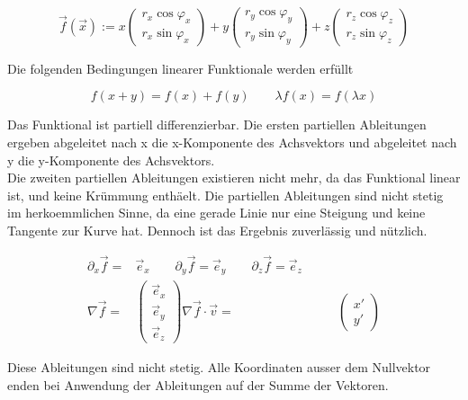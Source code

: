 \documentclass[a4paper]{article}
\begin{document}
\begin{displaymath}
\vec{f}(\vec{x}) := x \begin{pmatrix}r_x \cos \varphi_x\\r_x \sin \varphi_x\end{pmatrix} +y  \begin{pmatrix}r_y \cos \varphi_y\\r_y \sin \varphi_y\end{pmatrix} +z  \begin{pmatrix}r_z \cos \varphi_z\\r_z \sin \varphi_z\end{pmatrix}
\end{displaymath}

Die folgenden Bedingungen linearer Funktionale werden erf\"ullt

\begin{displaymath}
    f(x + y) = f(x) + f(y)\qquad\lambda f(x) = f(\lambda x)
\end{displaymath}

Das Funktional ist partiell differenzierbar. Die ersten partiellen Ableitungen ergeben abgeleitet nach x die x-Komponente  des Achsvektors und abgeleitet nach y die y-Komponente des Achsvektors.\\

Die zweiten partiellen Ableitungen existieren nicht mehr, da das Funktional linear ist, und keine Kr\"ummung enth\"aelt. Die partiellen Ableitungen sind nicht stetig im herkoemmlichen Sinne, da eine gerade Linie nur eine Steigung und keine Tangente zur Kurve hat. Dennoch ist das Ergebnis zuverl\"assig und n\"utzlich.

\begin{displaymath}
\begin{align}
\partial_{x}\vec{f} =& \vec{e}_{x}\qquad
\partial_{y}\vec{f} = \vec{e}_{y}\qquad
\partial_{z}\vec{f} = \vec{e}_{z}\qquad\\
\nabla\vec{f} =& \begin{pmatrix}\vec{e}_{x}\\\vec{e}_{y}\\\vec{e}_{z}\end{pmatrix}
\nabla\vec{f}\cdot\vec{v} =& \begin{pmatrix}x'\\y'\end{pmatrix}
\end{align}
\end{displaymath}

Diese Ableitungen sind nicht stetig. Alle Koordinaten ausser dem Nullvektor enden bei Anwendung der Ableitungen auf der Summe der Vektoren.
\end{document}
